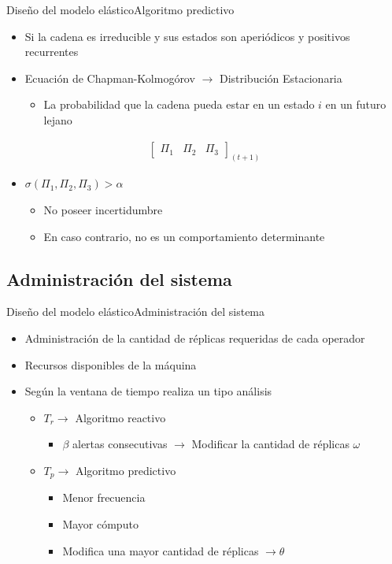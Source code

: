 \begin{frame}{Diseño del modelo elástico}{Algoritmo predictivo}
\begin{itemize}		
	\item Si la cadena es irreducible y sus estados son aperiódicos y positivos recurrentes
	\item Ecuación de Chapman-Kolmogórov $\rightarrow$ Distribución Estacionaria
	\begin{itemize}
		\item La probabilidad que la cadena pueda estar en un estado $i$ en un futuro lejano
	\end{itemize}
\end{itemize}
\vspace{-1cm}
\begin{center}
\begin{align*}
\begin{bmatrix}
	\Pi_1 & \Pi_2 & \Pi_3
\end{bmatrix} _{(t+1)}
\end{align*}
\end{center}
\vspace{-0.5cm}	
\begin{itemize}		
	\item $\sigma(\Pi_1, \Pi_2, \Pi_3) > \alpha$
	\begin{itemize}
		\item No poseer incertidumbre
		\item En caso contrario, no es un comportamiento determinante
	\end{itemize}
\end{itemize}
\end{frame}

\subsection*{Administración del sistema}
\begin{frame}{Diseño del modelo elástico}{Administración del sistema}
\begin{itemize}
\item Administración de la cantidad de réplicas requeridas de cada operador
\item Recursos disponibles de la máquina
\item Según la ventana de tiempo realiza un tipo análisis
\begin{itemize}
	\item $T_r \rightarrow $ Algoritmo reactivo
	\begin{itemize}
		\item $\beta$ alertas consecutivas $\rightarrow$ Modificar la cantidad de réplicas $\omega$
	\end{itemize}
	\item $T_p \rightarrow $ Algoritmo predictivo
	\begin{itemize}
		\item Menor frecuencia
		\item Mayor cómputo
		\item Modifica una mayor cantidad de réplicas $\rightarrow \theta$
	\end{itemize}
\end{itemize}
\end{itemize}
\end{frame}